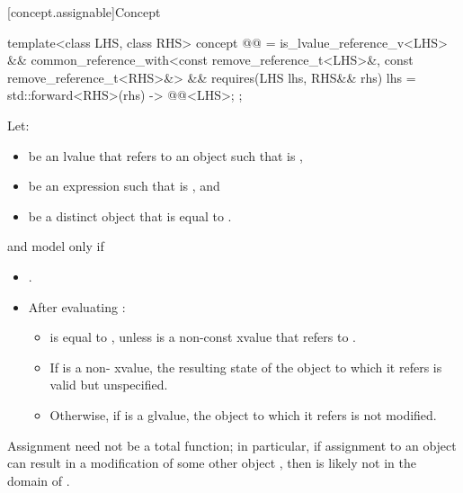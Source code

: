 [concept.assignable]{Concept }

\begin{itemdecl}
template<class LHS, class RHS>
  concept @@ =
    is_lvalue_reference_v<LHS> &&
    common_reference_with<const remove_reference_t<LHS>&, const remove_reference_t<RHS>&> &&
    requires(LHS lhs, RHS&& rhs) {
      { lhs = std::forward<RHS>(rhs) } -> @@<LHS>;
    };
\end{itemdecl}

\begin{itemdescr}
\pnum
Let:
\begin{itemize}
\item {} be an lvalue that refers to an object  such that
   is ,
\item {} be an expression such that  is
  , and
\item {} be a distinct object that is equal to .
\end{itemize}
 and  model
 only if

\begin{itemize}
\item {}.

\item After evaluating :

\begin{itemize}
\item {} is equal to , unless  is a non-const
xvalue that refers to .

\item If  is a non- xvalue, the resulting state of the
object to which it refers is valid but unspecified.

\item Otherwise, if  is a glvalue, the object to which it refers is
  not modified.
\end{itemize}
\end{itemize}

\pnum
\begin{note}
Assignment need not be a total function;
in particular, if assignment to an object  can result in a modification
of some other object , then  is likely not in the domain
of \tcode{=}.
\end{note}
\end{itemdescr}

